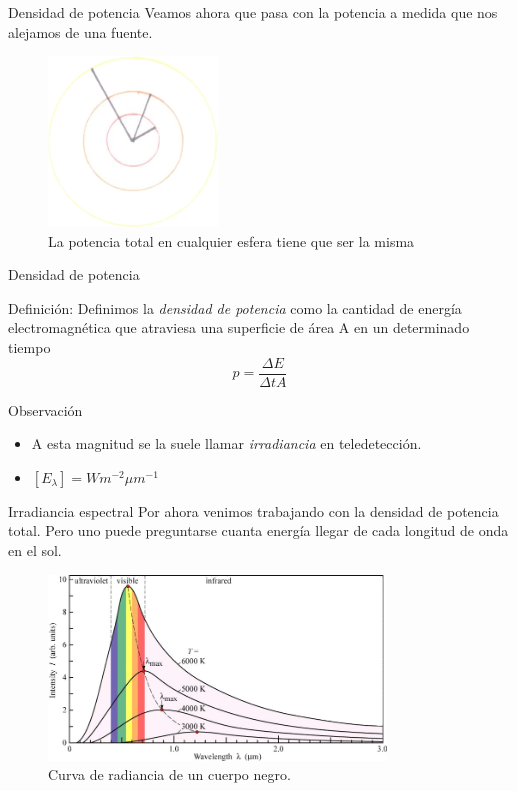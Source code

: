 \documentclass[handout]{beamer}
\begin{document}
\begin{frame}{Densidad de potencia}
  Veamos ahora que pasa con la potencia a medida que nos alejamos de una fuente.
  \begin{figure}
    \includegraphics[width=0.4\textwidth]{imagenes/inversa_fig.png}
    \caption{La potencia total en cualquier esfera tiene que ser la misma}
  \end{figure}
\end{frame}

\begin{frame}{Densidad de potencia}
  \begin{block}{Definición:}
    Definimos la \emph{densidad de potencia} como la cantidad de energía electromagnética que atraviesa una superficie de área A en un determinado tiempo
    \begin{equation}
      p = \frac{\Delta E}{\Delta t A}
    \end{equation}
  \end{block}\pause
  \begin{block}{Observación}
  \begin{itemize}[<.+>]
    \item A esta magnitud se la suele llamar \emph{irradiancia} en teledetección.
    \item $[E_\lambda] = W m^{-2} \mu m^{-1}$
  \end{itemize}
  \end{block}
\end{frame}

\begin{frame}{Irradiancia espectral}
  Por ahora venimos trabajando con la densidad de potencia total. Pero uno puede preguntarse cuanta energía llegar de cada longitud de onda en el sol.
  \begin{figure}
    \includegraphics[width=0.8\textwidth]{imagenes/black-body-radiation-curves.png}
    \caption{Curva de radiancia de un cuerpo negro.}
  \end{figure}
\end{frame}
\end{document}
